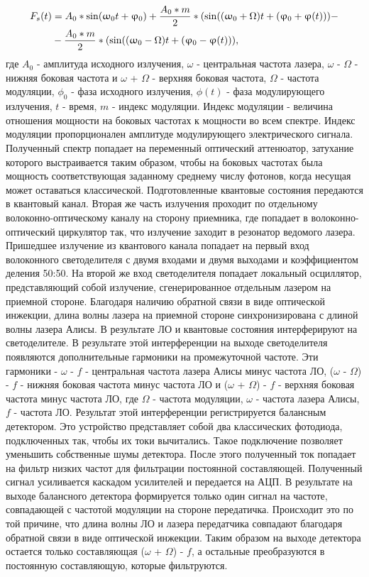 \begin{align}
\label{eq:spectrum seed}
F_s(t) & = A_0 * \sin(\omega_0 t + \phi_0) + \frac{A_0 * m}{2} * (\sin((\omega_0 + \Omega)t + (\phi_0 + \phi (t))) - \notag \\
&- \frac{A_0 * m}{2} * (\sin((\omega_0 - \Omega)t + (\phi_0 - \phi (t))),
\end{align}где $A_0$ - амплитуда исходного излучения,  $\omega$ - центральная частота лазера, $\omega$ - $\Omega$ - нижняя боковая частота  и $\omega$ + $\Omega$ - верхняя боковая частота, $\Omega$ - частота модуляции, $\phi_0$ - фаза исходного излучения, $\phi(t)$ - фаза модулирующего излучения, $t$ - время, $m$ - индекс модуляции. Индекс модуляции - величина отношения мощности на боковых частотах к мощности во всем спектре. Индекс модуляции пропорционален амплитуде модулирующего электрического сигнала.  Полученный спектр попадает на переменный оптический аттенюатор, затухание которого выстраивается таким образом, чтобы на боковых частотах была мощность соответствующая заданному среднему числу фотонов, когда несущая может оставаться классической. Подготовленные квантовые состояния передаются в квантовый канал. 
Вторая же часть излучения проходит по отдельному волоконно-оптическому каналу на сторону приемника, где попадает в волоконно-оптический циркулятор так, что излучение заходит в резонатор ведомого лазера. 
Пришедшее излучение из квантового канала попадает на первый вход волоконного светоделителя с двумя входами и двумя выходами и коэффициентом деления 50:50. На второй же вход светоделителя попадает локальный осциллятор, представляющий собой излучение, сгенерированное отдельным лазером на приемной стороне. Благодаря наличию обратной связи в виде оптической инжекции, длина волны лазера на приемной стороне синхронизирована с длиной волны лазера Алисы. В результате ЛО и квантовые состояния интерферируют на светоделителе. В результате этой интерференции на выходе светоделителя появляются дополнительные гармоники на промежуточной частоте. Эти гармоники -  $\omega$ - $f$ - центральная частота лазера Алисы минус частота ЛО, ($\omega$ - $\Omega$) - $f$  - нижняя боковая частота минус частота ЛО   и ($\omega$ + $\Omega$) - $f$ - верхняя боковая частота минус частота ЛО, где $\Omega$ - частота модуляции, $\omega$ - частота лазера Алисы, $f$ - частота ЛО. 
\newline Результат этой интерференции регистрируется балансным детектором. Это устройство представляет собой два классических фотодиода, подключенных так, чтобы их токи вычитались. Такое подключение позволяет уменьшить собственные шумы детектора. После этого полученный ток попадает на фильтр низких частот для фильтрации постоянной составляющей. Полученный сигнал усиливается каскадом усилителей и передается на АЦП.  В результате на выходе балансного детектора формируется только один сигнал на частоте, совпадающей с частотой модуляции на стороне передатичка. Происходит это по той причине, что длина волны ЛО и лазера передатчика совпадают благодаря обратной связи в виде оптической инжекции. Таким образом на выходе детектора остается только составляющая ($\omega$ + $\Omega$) - $f$, а остальные преобразуются в постоянную составляющую, которые фильтруются. 
